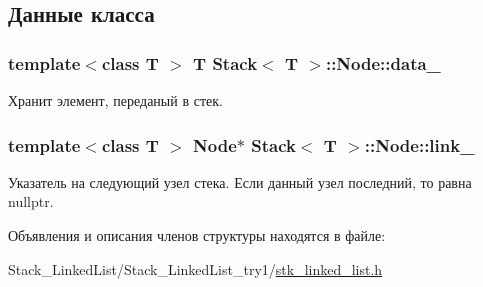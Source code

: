 \subsection{Данные класса}
\hypertarget{struct_stack_1_1_node_aad1bf4e68aae74727c28fa543573ef6b}{}
\subsubsection[{data\+\_\+}]{\setlength{\rightskip}{0pt plus 5cm}template$<$class T $>$ T {\bf Stack}$<$ T $>$\+::Node\+::data\+\_\+}\label{struct_stack_1_1_node_aad1bf4e68aae74727c28fa543573ef6b}


Хранит элемент, переданый в стек. 

\hypertarget{struct_stack_1_1_node_a9d4f0632f74c398b88f3026649383394}{}
\subsubsection[{link\+\_\+}]{\setlength{\rightskip}{0pt plus 5cm}template$<$class T $>$ {\bf Node}$\ast$ {\bf Stack}$<$ T $>$\+::Node\+::link\+\_\+}\label{struct_stack_1_1_node_a9d4f0632f74c398b88f3026649383394}


Указатель на следующий узел стека. Если данный узел последний, то равна nullptr. 



Объявления и описания членов структуры находятся в файле\+:\begin{DoxyCompactItemize}
\item 
Stack\+\_\+\+Linked\+List/\+Stack\+\_\+\+Linked\+List\+\_\+try1/\hyperlink{stk__linked__list_8h}{stk\+\_\+linked\+\_\+list.\+h}\end{DoxyCompactItemize}
